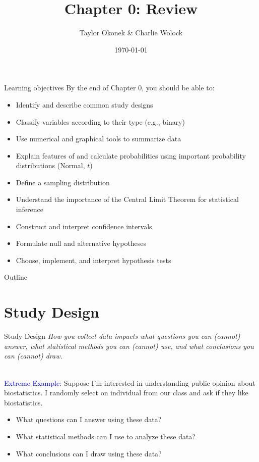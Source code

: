 \documentclass[10pt,t]{beamer}
\title{Chapter 0: Review}
\author{Taylor Okonek \& Charlie Wolock}
\date{\today}
\begin{document}
	\begin{frame}
	\titlepage 
\end{frame}

\begin{frame}{Learning objectives}
By the end of Chapter 0, you should be able to:
\begin{itemize}
	\item Identify and describe common study designs
	\item Classify variables according to their type (e.g., binary)
	\item Use numerical and graphical tools to summarize data
	\item Explain features of and calculate probabilities using important probability distributions (Normal, $t$)
	\item Define a sampling distribution
	\item Understand the importance of the Central Limit Theorem for statistical inference
	\item Construct and interpret confidence intervals
	\item Formulate null and alternative hypotheses
	\item Choose, implement, and interpret hypothesis tests
\end{itemize}
\end{frame}

\begin{frame}{Outline}
\tableofcontents
\end{frame}


\section{Study Design}

\begin{frame}{Study Design}
\textit{How you collect data impacts what questions you can (cannot) answer, what statistical methods you can (cannot) use, and what conclusions you can (cannot) draw.} \\~\

\textcolor{blue}{Extreme Example:} Suppose I'm interested in understanding public opinion about biostatistics. I randomly select on individual from our class and ask if they like biostatistics.

\begin{itemize}
	\item What questions can I answer using these data?
	\item What statistical methods can I use to analyze these data?
	\item What conclusions can I draw using these data?
\end{itemize}
\end{frame}
\end{document}
